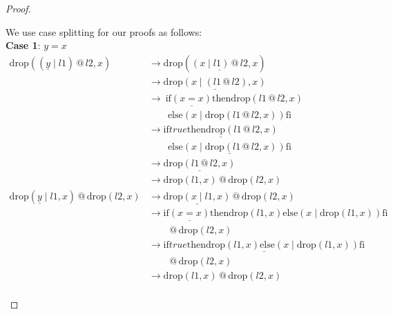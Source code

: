 \documentclass[12pt, a4paper]{article}
\newcommand{\rel}[1]{\mathrel{#1}}
\newcommand{\rmx}[1]{\mathrm{#1}}
\newcommand{\larrow}{\longrightarrow}
\newcommand{\under}{\underline}
\begin{document}
\begin{proof}
\begin{description}
We use case splitting for our proofs as follows: \\
\textbf{Case 1}: $y = x$
\begin{align*}
\rmx{drop}((\under{y} \rel{|} l1) \rel{@} l2, x)
	&\larrow \rmx{drop}(\under{(x \rel{|} l1) \rel{@} l2}, x) \tag{by case splitting} \\
	&\larrow \under{\rmx{drop}(x \rel{|} (l1 \rel{@} l2), x)} \tag{by @2} \\
	&\larrow\ \rel{\rmx{if}} \under{(x = x)} \rel{\rmx{then}} \rmx{drop}(l1 \rel{@} l2, x) \\
	&\quad \quad \rel{\rmx{else}} (x \rel{|} \rmx{drop}(l1 \rel{@} l2, x)) \rel{\rmx{fi}} \tag{by drop2} \\
	&\larrow \under{\rel{\rmx{if}} true \rel{\rmx{then}} \rmx{drop}(l1 \rel{@} l2, x)} \\
	&\quad \quad \under{\rel{\rmx{else}} (x \rel{|} \rmx{drop}(l1 \rel{@} l2, x)) \rel{\rmx{fi}}} \tag{by equality} \\
	&\larrow \under{\rmx{drop}(l1 \rel{@} l2, x)} \tag{by if1} \\
	&\larrow \rmx{drop}(l1, x) \rel{@} \rmx{drop}(l2, x) \tag{by IH} \\
\rmx{drop}(\under{y} \rel{|} l1, x) \rel{@} \rmx{drop}(l2, x)
	&\larrow \under{\rmx{drop}(x \rel{|} l1, x)} \rel{@} \rmx{drop}(l2, x) \tag{by case splitting} \\
	&\larrow \rel{\rmx{if}} \under{(x = x)} \rel{\rmx{then}} \rmx{drop}(l1, x) \rel{\rmx{else}} (x \rel{|} \rmx{drop}(l1, x)) \rel{\rmx{fi}} \\
	&\quad \quad \rel{@} \rmx{drop}(l2, x) \tag{by drop2} \\
	&\larrow \under{\rel{\rmx{if}} true \rel{\rmx{then}} \rmx{drop}(l1, x) \rel{\rmx{else}} (x \rel{|} \rmx{drop}(l1, x)) \rel{\rmx{fi}}} \\
	&\quad \quad \rel{@} \rmx{drop}(l2, x) \tag{by equality} \\
	&\larrow \rmx{drop}(l1, x) \rel{@} \rmx{drop}(l2, x) \tag{by if1} \\
\end{align*}


\end{description}
\end{proof}
\end{document}
